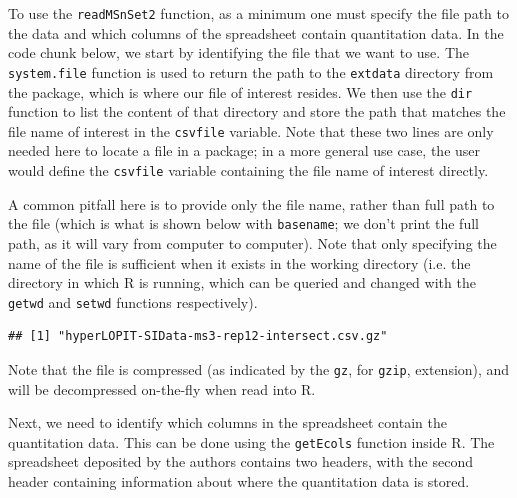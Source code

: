 To use the \texttt{readMSnSet2} function, as a minimum one must
specify the file path to the data and which columns of the spreadsheet
contain quantitation data. In the code chunk below, we start by
identifying the file that we want to use. The \texttt{system.file}
function is used to return the path to the \texttt{extdata} directory
from the  package, which is where our file of
interest resides. We then use the \texttt{dir} function to list the
content of that directory and store the path that matches the file
name of interest in the \texttt{csvfile} variable. Note that these two lines
are only needed here to locate a file in a package; in a more general
use case, the user would define the \texttt{csvfile} variable
containing the file name of interest directly.

A common pitfall here is to provide only the file name, rather than
full path to the file (which is what is shown below with
\texttt{basename}; we don't print the full path, as it will vary from
computer to computer). Note that only specifying the name of the file
is sufficient when it exists in the working directory (i.e. the
directory in which R is running, which can be queried and changed with
the \texttt{getwd} and \texttt{setwd} functions respectively).

\begin{knitrout}
\color{fgcolor}\begin{kframe}
\begin{alltt}
 \hlkwb{<-} \hlstd{(}\hlstd{,}  \hlstd{=} \hlstd{)}
 \hlkwb{<-}   \hlstd{=} \hlstd{,}
           \hlstd{=} \hlstd{)}
\end{alltt}
\begin{verbatim}
## [1] "hyperLOPIT-SIData-ms3-rep12-intersect.csv.gz"
\end{verbatim}
\end{kframe}
\end{knitrout}

Note that the file is compressed (as indicated by the \texttt{gz}, for
\texttt{gzip}, extension), and will be decompressed on-the-fly when
read into R.

Next, we need to identify which columns in the spreadsheet contain the
quantitation data. This can be done using the \texttt{getEcols}
function inside R. The spreadsheet deposited by the authors contains
two headers, with the second header containing information about where
the quantitation data is stored.

